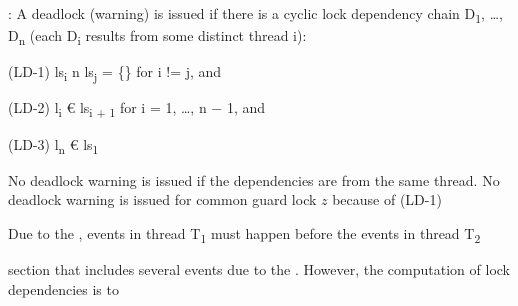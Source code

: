 \documentclass[landscape, a4paper]{article}
\begin{document}
\begin{minipage}[t]{0.195\linewidth}
\begin{betterlist}
		\adjustbox{scale=0.5}{
            \begin{dnumberedcodebox}[minted language=text,minted options={autogobble, fontsize=\Large}, box align=top]
            acq(t,y) {
                Ds = Ds U { (t,y,ls(t)) } if ls(t) != emptyset
                ls(t) = ls(t) U {y}
            }
            rel(t,y) {
                ls(t) = ls(t) \ {y}
            }
            fork(t1,t2) {
            }
            ...
            \end{dnumberedcodebox}
		}
		\item {}: A deadlock (warning) is issued if there is a cyclic lock dependency chain D\textsubscript{1}, \ldots, D\textsubscript{n} (each D\textsubscript{i} results from some distinct thread i):
		\begin{betterlist}
			\item (LD-1) ls\textsubscript{i} n ls\textsubscript{j} = \{\} for i != j, and
			\item (LD-2) l\textsubscript{i} € ls\textsubscript{i + 1} for i = 1, \ldots, n − 1, and
			\item (LD-3) l\textsubscript{n} € ls\textsubscript{1}
		\end{betterlist}
		\item {}
		\begin{betterlist}
			\item No deadlock warning is issued if the dependencies are from the same thread. No deadlock warning is issued for common guard lock $z$ because of (LD-1)
			\item {} Due to the , events in thread T\textsubscript{1} must happen before the events in thread T\textsubscript{2}
			\item {}  section that includes several events due to the . However, the computation of lock dependencies is  to 
		\end{betterlist}
	\end{betterlist}


\end{minipage}
\end{document}

